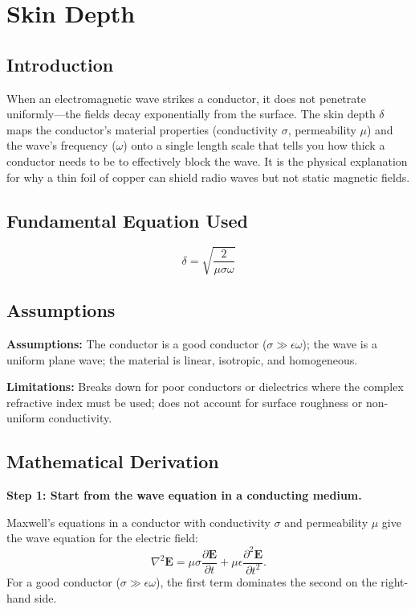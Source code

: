 \chapter{Skin Depth}

\section*{Introduction}

When an electromagnetic wave strikes a conductor, it does not penetrate uniformly---the fields decay exponentially from the surface. The skin depth $\delta$ maps the conductor's material properties (conductivity $\sigma$, permeability $\mu$) and the wave's frequency ($\omega$) onto a single length scale that tells you how thick a conductor needs to be to effectively block the wave. It is the physical explanation for why a thin foil of copper can shield radio waves but not static magnetic fields.
\section*{Fundamental Equation Used}

\begin{equation}
\delta = \sqrt{\frac{2}{\mu\sigma\omega}}
\end{equation}
\section*{Assumptions}

\textbf{Assumptions:} The conductor is a good conductor ($\sigma \gg \epsilon\omega$); the wave is a uniform plane wave; the material is linear, isotropic, and homogeneous.


\textbf{Limitations:} Breaks down for poor conductors or dielectrics where the complex refractive index must be used; does not account for surface roughness or non-uniform conductivity.


\section*{Mathematical Derivation}

\textbf{Step 1: Start from the wave equation in a conducting medium.}

Maxwell's equations in a conductor with conductivity $\sigma$ and permeability $\mu$ give the wave equation for the electric field:
\begin{equation}
\nabla^2\mathbf{E} = \mu\sigma\frac{\partial\mathbf{E}}{\partial t} + \mu\epsilon\frac{\partial^2\mathbf{E}}{\partial t^2}.
\end{equation}
For a good conductor ($\sigma \gg \epsilon\omega$), the first term dominates the second on the right-hand side.

